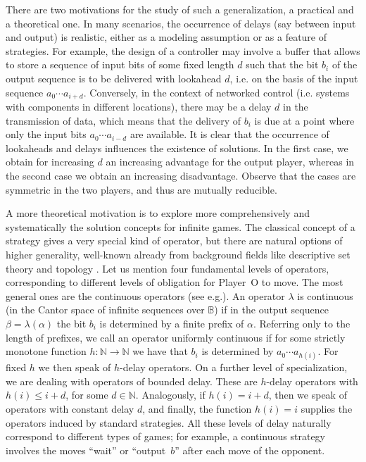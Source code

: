 \documentclass[fleqn,envcountsame]{LMCS}
\newcommand{\pO}{Player~O\xspace}
\newcommand{\Nat}{\ensuremath{\mathbb{N}}\xspace}
\newcommand{\B}{\ensuremath{\mathbb{B}}\xspace}
\newcommand{\al}{\ensuremath{\alpha}\xspace}
\newcommand{\ie}{i.e.\xspace}
\newcommand{\eg}{e.g.\xspace}
\begin{document}
There are two motivations for the study of such a generalization,
a practical and a theoretical one. In many scenarios, the occurrence of
delays (say between input and output) is realistic, either as a
modeling assumption or as a feature of strategies. For example,
the design of a controller may involve a buffer that allows to store
a sequence of input bits of some fixed length $d$ such that the bit
$b_i$ of the output sequence is to be delivered with lookahead $d$,
\ie on the basis of the input sequence $a_0\cdots a_{i+d}$. Conversely,
in the context of networked control (\ie systems with components in
different locations), there may be a delay $d$ in the transmission of
data, which means that the delivery of $b_i$ is due at a point where
only the input bits $a_0\cdots a_{i-d}$ are available. It is clear
that the occurrence of lookaheads and delays influences the existence
of solutions. In the first case, we obtain for increasing $d$ an increasing
advantage for the output player, whereas in the second case we obtain
an increasing disadvantage. Observe that the cases are symmetric
in the two players, and thus are mutually reducible.

A more theoretical motivation is to explore more comprehensively
and systematically the solution concepts for infinite games.
The classical concept of a strategy gives a very special kind of operator,
but there are natural options of higher generality, well-known
already from background fields like descriptive set theory and topology \cite{Mosch80DST}.
Let us mention four fundamental levels of operators, corresponding to
different levels of obligation for \pO to move. The most general ones are
the continuous operators (see \eg \cite{TB73FinAutBehSynth,TL93LogSpecInfComp}).
An operator $\lambda$ is continuous (in the Cantor space of infinite
sequences over \B) if in the output sequence $\beta = \lambda(\al)$
the bit $b_i$ is determined by a finite prefix of $\al$.
Referring only to the length of prefixes, we call an operator
uniformly continuous if for some strictly monotone function $h:\Nat\to\Nat$ we have that $b_i$
is determined by $a_0\cdots a_{h(i)}$. For fixed $h$ we then speak of $h$-delay operators.
On a further level of specialization, we are dealing with operators of
bounded delay. These are $h$-delay operators with $h(i)\leq i+d$, for some $d\in\Nat$.
Analogously, if $h(i)=i+d$, then we speak of operators with constant delay $d$, and
finally, the function $h(i)=i$ supplies the operators induced by standard strategies.
All these levels of delay naturally correspond to different types of games;
for example, a continuous strategy involves the moves ``wait'' or
``output~$b$'' after each move of the opponent.
\end{document}
